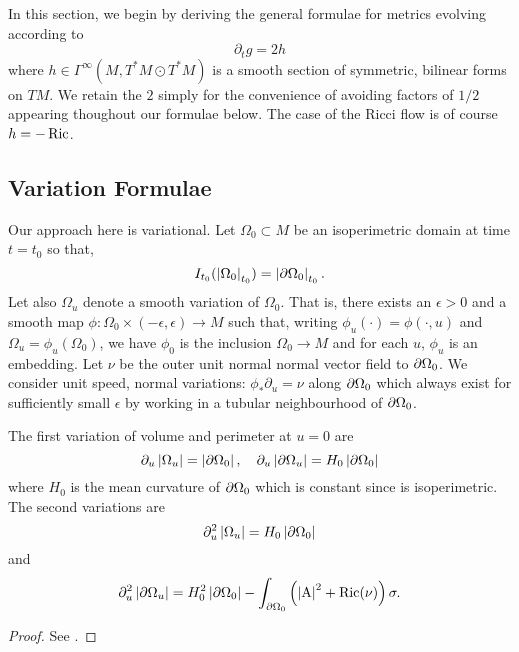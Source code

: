 \documentclass{amsart}
\begin{document}
In this section, we begin by deriving the general formulae for metrics evolving according to
\begin{equation}
\label{eq:dtg}
\partial_t g = 2h
\end{equation}
where \(h \in \Gamma^{\infty}(M, T^{\ast}M \odot T^{\ast} M)\) is a smooth section of symmetric, bilinear forms on \(TM\). We retain the \(2\) simply for the convenience of avoiding factors of \(1/2\) appearing thoughout our formulae below. The case of the Ricci flow is of course \(h = -\operatorname{Ric}\).

\subsection{Variation Formulae}
\label{subsec:iso_diff_ineq_variation}

Our approach here is variational. Let \(\Omega_0 \subset M\) be an isoperimetric domain at time \(t = t_0\) so that,
\[
I_{t_0} (\left|{\Omega_0}\right|_{t_0}) = \left|{\partial {\Omega_0}}\right|_{t_0}.
\]
Let also \(\Omega_u\) denote a smooth variation of \(\Omega_0\). That is, there exists an \(\epsilon > 0\) and a smooth map \(\phi: \Omega_0 \times (-\epsilon, \epsilon) \to M\) such that, writing \(\phi_u(\cdot) = \phi(\cdot, u)\) and \(\Omega_u = \phi_u(\Omega_0)\), we have \(\phi_0\) is the inclusion \(\Omega_0 \to M\) and for each \(u\), \(\phi_u\) is an embedding. Let \(\nu\) be the outer unit normal normal vector field to \(\partial {\Omega_0}\). We consider unit speed, normal variations: \(\phi_{\ast} \partial_u = \nu\) along \(\partial {\Omega_0}\) which always exist for sufficiently small \(\epsilon\) by working in a tubular neighbourhood of \(\partial {\Omega_0}\).

\begin{lemma}
\label{lem:spatial_variation}
The first variation of volume and perimeter at \(u = 0\) are
\[
\partial_u \left|{\Omega_u}\right| = \left|{\partial {\Omega_0}}\right|, \quad \partial_u \left|{\partial {\Omega_u}}\right| = H_0 \left|{\partial {\Omega_0}}\right|
\]
where \(H_0\) is the mean curvature of \(\partial {\Omega_0}\) which is constant since is isoperimetric. The second variations are
\[
\partial_u^2 \left|{\Omega_u}\right| = H_0 \left|{\partial {\Omega_0}}\right|
\]
and
\[
\partial_u^2 \left|{\partial {\Omega_u}}\right| = H_0^2 \left|{\partial {\Omega_0}}\right| - \int_{\partial {\Omega_0}} \left(\left|{\operatorname{A}}\right|^2 + \operatorname{Ric}(\nu)\right) \sigma.
\]
\end{lemma}

\begin{proof}
See \cite[Chapter 1]{Li:/2012}.
\end{proof}
\end{document}
